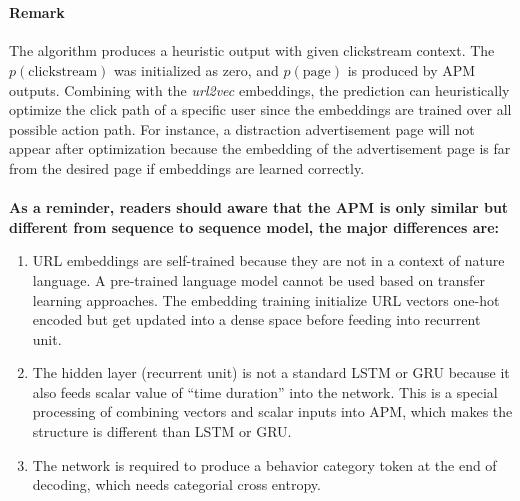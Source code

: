~\\

\paragraph{Remark} The algorithm produces a heuristic output with given clickstream context.
The $p(\text{clickstream})$ was initialized as zero, and $p(\text{page})$ is produced by APM outputs.
Combining with the \emph{url2vec} embeddings, the prediction
can heuristically optimize the click path of a specific user since the embeddings 
are trained over all possible action path. For instance, 
a distraction advertisement page will not appear
after optimization because the embedding of the advertisement page 
is far from the desired page if embeddings are learned correctly.

\paragraph{}

\textbf{As a reminder, readers should aware that the APM is only similar but different 
from sequence to sequence model, the major differences are:}

\begin{enumerate}
    \item URL embeddings are self-trained because they are not in a context of nature language. 
    A pre-trained language model cannot be used based on transfer learning approaches.
    The embedding training initialize URL vectors one-hot encoded but get updated 
    into a dense space before feeding into recurrent unit.
    \item The hidden layer (recurrent unit) is not a standard LSTM or GRU 
    because it also feeds scalar value of ``time duration'' into the network.
    This is a special processing of combining vectors and scalar inputs into APM, 
    which makes the structure is different than LSTM or GRU.
    \item The network is required to produce a behavior category token at the end of decoding, 
    which needs categorial cross entropy.
\end{enumerate}

\cleardoublepage